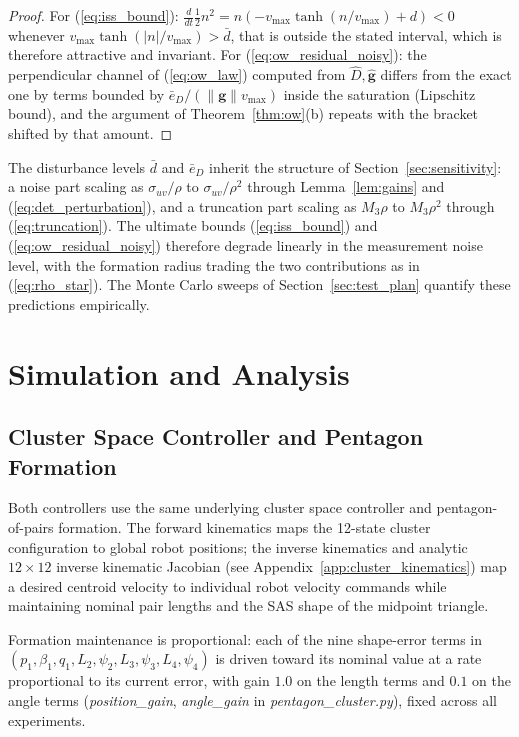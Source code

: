 \documentclass[12pt, letterpaper, oneside]{report}
\begin{document}
\begin{proof}
For (\ref{eq:iss_bound}): $\tfrac{d}{dt}\tfrac{1}{2}n^2 = n(-v_{\max}
\tanh(n/v_{\max}) + d) < 0$ whenever $v_{\max}\tanh(|n|/v_{\max}) >
\bar{d}$, that is outside the stated interval, which is therefore
attractive and invariant. For (\ref{eq:ow_residual_noisy}): the
perpendicular channel of (\ref{eq:ow_law}) computed from $\hat{D},
\hat{\mathbf{g}}$ differs from the exact one by terms bounded by
$\bar{e}_D/(\|\mathbf{g}\|v_{\max})$ inside the saturation (Lipschitz
bound), and the argument of Theorem~\ref{thm:ow}(b) repeats with the
bracket shifted by that amount.
\end{proof}

The disturbance levels $\bar{d}$ and $\bar{e}_D$ inherit the structure
of Section~\ref{sec:sensitivity}: a noise part scaling as
$\sigma_{uv}/\rho$ to $\sigma_{uv}/\rho^2$ through Lemma~\ref{lem:gains}
and (\ref{eq:det_perturbation}), and a truncation part scaling as
$M_3\rho$ to $M_3\rho^2$ through (\ref{eq:truncation}). The ultimate
bounds (\ref{eq:iss_bound}) and (\ref{eq:ow_residual_noisy}) therefore
degrade linearly in the measurement noise level, with the formation
radius trading the two contributions as in (\ref{eq:rho_star}). The
Monte Carlo sweeps of Section~\ref{sec:test_plan} quantify these
predictions empirically.

\section{Simulation and Analysis}
\label{sec:methods}

\subsection{Cluster Space Controller and Pentagon Formation}

Both controllers use the same underlying cluster space controller and
pentagon-of-pairs formation. The forward kinematics maps the 12-state
cluster configuration to global robot positions; the inverse kinematics
and analytic $12 \times 12$ inverse kinematic Jacobian (see
Appendix~\ref{app:cluster_kinematics}) map a desired centroid velocity to
individual robot velocity commands while maintaining nominal pair lengths
and the SAS shape of the midpoint triangle.

Formation maintenance is proportional: each of the nine shape-error
terms in $(p_1, \beta_1, q_1, L_2, \psi_2, L_3, \psi_3, L_4, \psi_4)$ is
driven toward its nominal value at a rate proportional to its current
error, with gain $1.0$ on the length terms and $0.1$ on the angle terms
(\textit{position\_gain}, \textit{angle\_gain} in
\textit{pentagon\_cluster.py}), fixed across all experiments.
\end{document}
